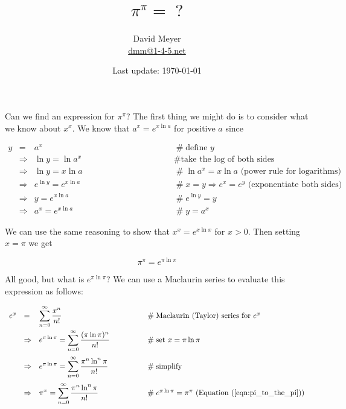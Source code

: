 \documentclass[14pt, oneside]{article}
\title{{\Huge $\pi^\pi = \; ?$}}
\author{David Meyer \\ \href{mailto:dmm@1-4-5.net}{dmm@1-4-5.net}}
\date{Last update: \today}
\begin{document}
\maketitle

\large
\noindent
Can we find an expression for $\pi^\pi$? The first thing 
we might do is to consider what we know about $x^x$. We 
know that $a^x = e^{x \ln a}$ for positive $a$ since

\medskip
\begin{equation*}
\begin{array}{llll}
y
&=& a^x											&\qquad \qquad \qquad \qquad \qquad \mathrel{\#} \text{define $y$} \\
[10pt]
&\Rightarrow& \ln y = \ln a^x					&\qquad \qquad \qquad \qquad \qquad \mathrel{\#} \text{take the log of both sides} \\
[10pt]
&\Rightarrow& \ln y = x \ln a 					&\qquad \qquad \qquad \qquad \qquad \mathrel{\#} \text{$\ln a^x = x \ln a$ (power rule for logarithms)} \\
[10pt]
&\Rightarrow& e^{\ln y} = e^{x \ln a}			&\qquad \qquad \qquad \qquad \qquad \mathrel{\#} \text{$x = y \Rightarrow e^x = e^y$ (exponentiate both sides)} \\
[10pt]
&\Rightarrow& y = e^{x \ln a}					&\qquad \qquad \qquad \qquad \qquad \mathrel{\#} e^{\ln y} = y \\
[10pt]
&\Rightarrow& a^x = e^{x \ln a}					&\qquad \qquad \qquad \qquad \qquad \mathrel{\#} y = a^x
\end{array}
\end{equation*}

\smallskip
\bigskip
\noindent
We can use the same reasoning to show that $x^x = e^{x \ln
x}$ for $x > 0$. Then setting $x = \pi$ we get

{\Large
\begin{equation}
{\displaystyle \pi^{\pi} = e^{\pi \ln \pi}}
\label{eqn:pi_to_the_pi}
\end{equation}}

\noindent
All good, but what is $e^{\pi \ln \pi}$? We can use a Maclaurin
series to evaluate this expression as follows:

\medskip
\begin{equation*}
\begin{array}{llll}
e^x
&=& {\displaystyle \sum\limits_{n=0}^{\infty} \dfrac{x^n}{n!}}
	&\qquad \qquad \mathrel{\#} \text{Maclaurin (Taylor) series for $e^x$} \\
[12pt]
&\Rightarrow& {\displaystyle e^{\pi \ln \pi} = \sum\limits_{n=0}^{\infty} \dfrac{(\pi \ln\pi)^n}{n!}}	
		&\qquad \qquad \mathrel{\#} \text{set $x = \pi \ln \pi$} \\
[15pt]
&\Rightarrow& {\displaystyle e^{\pi \ln \pi} =\sum\limits_{n=0}^{\infty} \dfrac{\pi^n \ln^n\pi}{n!}} 		
	&\qquad \qquad \mathrel{\#} \text{simplify} \\
[15pt]
&\Rightarrow& {\displaystyle \pi^\pi = \sum\limits_{n=0}^{\infty} \dfrac{\pi^n \ln^n\pi}{n!}}													
	&\qquad \qquad \mathrel{\#} \text{$e^{\pi \ln \pi} = \pi^\pi$ (Equation (\ref{eqn:pi_to_the_pi}))}
 
\end{array}
\end{equation*}
\end{document}
